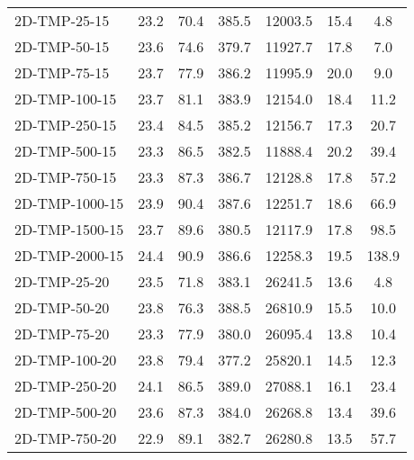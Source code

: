 \documentclass{article}
\begin{document}
\begin{center}
\begin{table}[h]
\begin{tabular}{|l||c|c|c|c|c|c|}
            2D-TMP-25-15                   & 23.2      & 70.4       & 385.5       & 12003.5  & 15.4      & 4.8        \\
            2D-TMP-50-15                   & 23.6      & 74.6       & 379.7       & 11927.7  & 17.8      & 7.0        \\
            2D-TMP-75-15                   & 23.7      & 77.9       & 386.2       & 11995.9  & 20.0      & 9.0        \\
            2D-TMP-100-15                  & 23.7      & 81.1       & 383.9       & 12154.0  & 18.4      & 11.2       \\
            2D-TMP-250-15                  & 23.4      & 84.5       & 385.2       & 12156.7  & 17.3      & 20.7       \\
            2D-TMP-500-15                  & 23.3      & 86.5       & 382.5       & 11888.4  & 20.2      & 39.4       \\
            2D-TMP-750-15                  & 23.3      & 87.3       & 386.7       & 12128.8  & 17.8      & 57.2       \\
            2D-TMP-1000-15                 & 23.9      & 90.4       & 387.6       & 12251.7  & 18.6      & 66.9       \\
            2D-TMP-1500-15                 & 23.7      & 89.6       & 380.5       & 12117.9  & 17.8      & 98.5       \\
            2D-TMP-2000-15                 & 24.4      & 90.9       & 386.6       & 12258.3  & 19.5      & 138.9      \\
            \hline
            2D-TMP-25-20                   & 23.5      & 71.8       & 383.1       & 26241.5  & 13.6      & 4.8        \\
            2D-TMP-50-20                   & 23.8      & 76.3       & 388.5       & 26810.9  & 15.5      & 10.0       \\
            2D-TMP-75-20                   & 23.3      & 77.9       & 380.0       & 26095.4  & 13.8      & 10.4       \\
            2D-TMP-100-20                  & 23.8      & 79.4       & 377.2       & 25820.1  & 14.5      & 12.3       \\
            2D-TMP-250-20                  & 24.1      & 86.5       & 389.0       & 27088.1  & 16.1      & 23.4       \\
            2D-TMP-500-20                  & 23.6      & 87.3       & 384.0       & 26268.8  & 13.4      & 39.6       \\
            2D-TMP-750-20                  & 22.9      & 89.1       & 382.7       & 26280.8  & 13.5      & 57.7       \\

\end{tabular}
\end{table}
\end{center}
\end{document}
